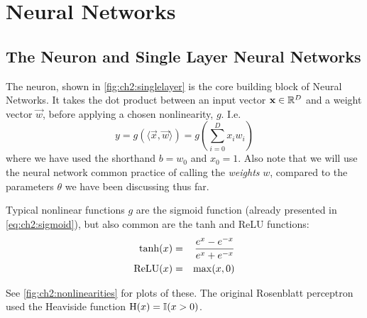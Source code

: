 \section{Neural Networks}\label{sec:ch2:cnns}
\subsection{The Neuron and Single Layer Neural Networks}

\begin{figure}
  \centering
  
  \label{fig:ch2:singlelayer}
\end{figure}

The neuron, shown in \autoref{fig:ch2:singlelayer} is the core building block of
Neural Networks. It takes the dot product between an input vector $\vec{x} \in
\reals[D]$ and a weight vector $\vec{w}$, before applying a chosen nonlinearity,
$g$. I.e.
%
\begin{equation}
  y = g(\langle\vec{x}, \vec{w}\rangle) = g\left(\sum_{i=0}^{D} x_i w_i \right) 
\end{equation}
%
where we have used the shorthand $b=w_0$ and $x_0 = 1$. Also note that we will
use the neural network common practice of calling the \emph{weights} $w$,
compared to the parameters $\theta$ we have been discussing thus far.

Typical nonlinear functions $g$ are the sigmoid function (already presented in 
\eqref{eq:ch2:sigmoid}), but also common are the tanh and ReLU functions:
\begin{eqnarray}
  \F{tanh}(x) &=& \frac{e^{x} - e^{-x}}{e^{x} + e^{-x}} \label{eq:ch2:tanh}\\
  \F{ReLU}(x) &=& \max (x, 0) \label{eq:ch2:relu}
\end{eqnarray}

See \autoref{fig:ch2:nonlinearities} for plots of these. The original Rosenblatt
perceptron \cite{rosenblatt_perceptron:_1958} used the Heaviside function
$\F{H}(x) = \mathbb{I}(x > 0)$. %

